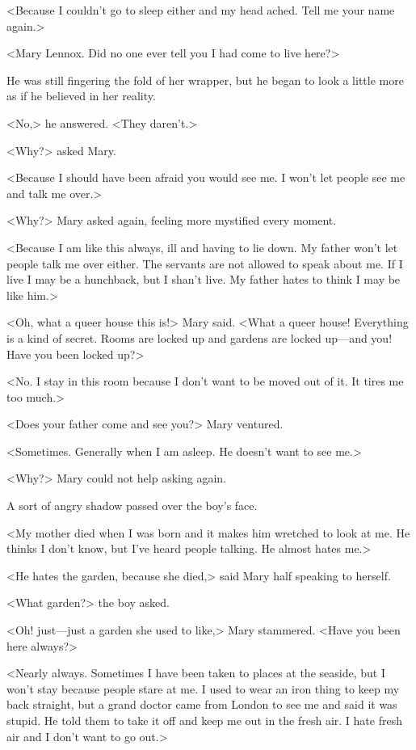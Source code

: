 <Because I couldn't go to sleep either and my head ached. Tell me your name again.>

<Mary Lennox. Did no one ever tell you I had come to live here?>

He was still fingering the fold of her wrapper, but he began to look a little more as if he believed in her reality.

<No,> he answered. <They daren't.>

<Why?> asked Mary.

<Because I should have been afraid you would see me. I won't let people see me and talk me over.>

<Why?> Mary asked again, feeling more mystified every moment.

<Because I am like this always, ill and having to lie down. My father won't let people talk me over either. The servants are not allowed to speak about me. If I live I may be a hunchback, but I shan't live. My father hates to think I may be like him.>

<Oh, what a queer house this is!> Mary said. <What a queer house! Everything is a kind of secret. Rooms are locked up and gardens are locked up—and you! Have you been locked up?>

<No. I stay in this room because I don't want to be moved out of it. It tires me too much.>

<Does your father come and see you?> Mary ventured.

<Sometimes. Generally when I am asleep. He doesn't want to see me.>

<Why?> Mary could not help asking again.

A sort of angry shadow passed over the boy's face.

<My mother died when I was born and it makes him wretched to look at me. He thinks I don't know, but I've heard people talking. He almost hates me.>

<He hates the garden, because she died,> said Mary half speaking to herself.

<What garden?> the boy asked.

<Oh! just—just a garden she used to like,> Mary stammered. <Have you been here always?>

<Nearly always. Sometimes I have been taken to places at the seaside, but I won't stay because people stare at me. I used to wear an iron thing to keep my back straight, but a grand doctor came from London to see me and said it was stupid. He told them to take it off and keep me out in the fresh air. I hate fresh air and I don't want to go out.>

